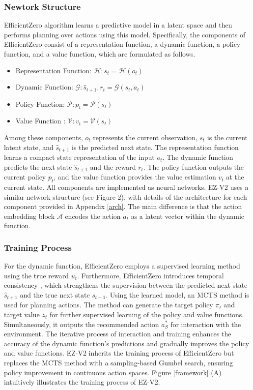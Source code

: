 \subsubsection{Newtork Structure}
EfficientZero algorithm learns a predictive model in a latent space and then performs planning over actions using this model. Specifically, the components of EfficientZero consist of a representation function, a dynamic function, a policy function, and a value function, which are formulated as follows.
\begin{itemize}
    \item Representation Function:  $\mathcal{H}:s_t=\mathcal{H}(o_t)$
    \item Dynamic Function: $\mathcal{G}: \hat{s}_{t+1}, r_t =\mathcal{G}(s_t,a_t)$ 
    \item Policy Function: $\mathcal{P}:p_t=\mathcal{P}(s_t)$
    \item Value Function : $\mathcal{V}: v_t = \mathcal{V}(s_t)$
\end{itemize}
Among these components, \( o_t \) represents the current observation, \( s_t \) is the current latent state, and \( \hat{s}_{t+1} \) is the predicted next state. The representation function learns a compact state representation of the input \( o_t \). The dynamic function predicts the next state \( \hat{s}_{t+1} \) and the reward \( r_t \). 
The policy function outputs the current policy \( p_t \), and the value function provides the value estimation \( v_t \) at the current state. All components are implemented as neural networks. EZ-V2 uses a similar network structure (see Figure 2), with details of the architecture for each component provided in Appendix \ref{arch}. The main difference is that the action embedding block \( \mathcal{A} \) encodes the action \( a_t \) as a latent vector within the dynamic function.


\subsubsection{Training Process}
For the dynamic function, EfficientZero employs a supervised learning method using the true reward \( u_t \). Furthermore, EfficientZero introduces temporal consistency \citep{ye2021mastering}, which strengthens the supervision between the predicted next state \( \hat{s}_{t+1} \) and the true next state \( s_{t+1} \).
Using the learned model, an MCTS method is used for planning actions. The method can generate the target policy \( \pi_t \) and target value \( z_t \) for further supervised learning of the policy and value functions. 
Simultaneously, it outputs the recommended action \( a^*_S \) for interaction with the environment. The iterative process of interaction and training enhances the accuracy of the dynamic function's predictions and gradually improves the policy and value functions.
EZ-V2 inherits the training process of EfficientZero but replaces the MCTS method with a sampling-based Gumbel search, ensuring policy improvement in continuous action spaces. Figure \ref{framework} (A) intuitively illustrates the training process of EZ-V2.


